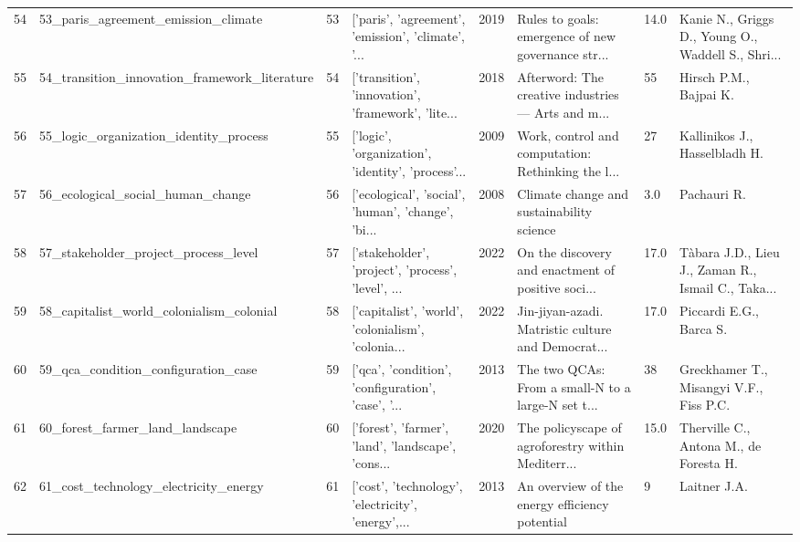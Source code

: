 \begin{tabular}{rlrlrlll}
         54 &                53\_paris\_agreement\_emission\_climate &        53 & ['paris', 'agreement', 'emission', 'climate', '... &          2019 & Rules to goals: emergence of new governance str... &    14.0 & Kanie N., Griggs D., Young O., Waddell S., Shri... \\
         55 &      54\_transition\_innovation\_framework\_literature &        54 & ['transition', 'innovation', 'framework', 'lite... &          2018 & Afterword: The creative industries — Arts and m... &      55 &                             Hirsch P.M., Bajpai K. \\
         56 &             55\_logic\_organization\_identity\_process &        55 & ['logic', 'organization', 'identity', 'process'... &          2009 & Work, control and computation: Rethinking the l... &      27 &                      Kallinikos J., Hasselbladh H. \\
         57 &                  56\_ecological\_social\_human\_change &        56 & ['ecological', 'social', 'human', 'change', 'bi... &          2008 &          Climate change and sustainability science &     3.0 &                                        Pachauri R. \\
         58 &               57\_stakeholder\_project\_process\_level &        57 & ['stakeholder', 'project', 'process', 'level', ... &          2022 & On the discovery and enactment of positive soci... &    17.0 & Tàbara J.D., Lieu J., Zaman R., Ismail C., Taka... \\
         59 &           58\_capitalist\_world\_colonialism\_colonial &        58 & ['capitalist', 'world', 'colonialism', 'colonia... &          2022 & Jin-jiyan-azadi. Matristic culture and Democrat... &    17.0 &                            Piccardi E.G., Barca S. \\
         60 &                59\_qca\_condition\_configuration\_case &        59 & ['qca', 'condition', 'configuration', 'case', '... &          2013 & The two QCAs: From a small-N to a large-N set t... &      38 &            Greckhamer T., Misangyi V.F., Fiss P.C. \\
         61 &                    60\_forest\_farmer\_land\_landscape &        60 & ['forest', 'farmer', 'land', 'landscape', 'cons... &          2020 & The policyscape of agroforestry within Mediterr... &    15.0 &             Therville C., Antona M., de Foresta H. \\
         62 &              61\_cost\_technology\_electricity\_energy &        61 & ['cost', 'technology', 'electricity', 'energy',... &          2013 &     An overview of the energy efficiency potential &       9 &                                       Laitner J.A. \\

\end{tabular}
